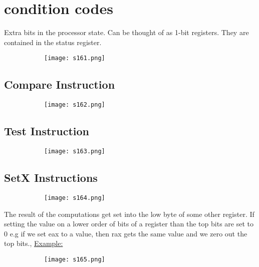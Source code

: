 \documentclass[8pt]{extreport}
\begin{document}
\section{condition codes}

Extra bits in the processor state. Can be thought of as 1-bit registers. They are contained in the status register.
\begin{figure}[H]
\centering
\begin{subfigure}[b]{0.4\linewidth}
\texttt{[image: s161.png]}
\end{subfigure}
\end{figure}

\subsection{Compare Instruction}
\begin{figure}[H]
\centering
\begin{subfigure}[b]{0.4\linewidth}
\texttt{[image: s162.png]}
\end{subfigure}
\end{figure}
 \subsection{Test Instruction}
\begin{figure}[H]
\centering
\begin{subfigure}[b]{0.4\linewidth}
\texttt{[image: s163.png]}
\end{subfigure}
\end{figure}
\subsection{SetX Instructions}
\begin{figure}[H]
\centering
\begin{subfigure}[b]{0.4\linewidth}
\texttt{[image: s164.png]}
\end{subfigure}
\end{figure}
The result of the computations get set into the low byte of some other register. If setting  the value on a lower order of bits of a register than the top bits are set to 0 e.g if we set eax to a value, then rax gets the same value and we zero out the top bits.,
\underline{Example:}
\begin{figure}[H]
\centering
\begin{subfigure}[b]{0.4\linewidth}
\texttt{[image: s165.png]}
\end{subfigure}
\end{figure}
\end{document}

